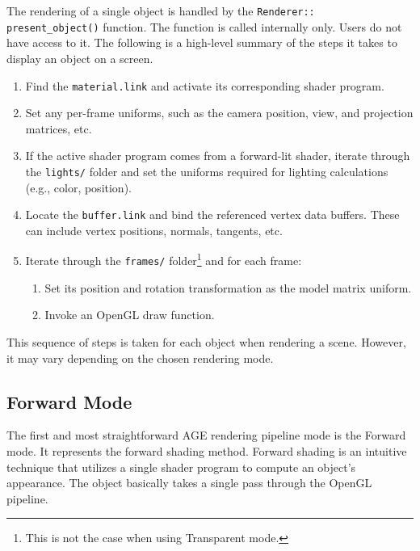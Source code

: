 \documentclass[
  digital,     %
  oneside,     %
  nosansbold,  %
  nocolorbold, %
  lof,         %
  lot,         %
]{fithesis4}
\begin{document}
The rendering of a single object is handled by the \verb|Renderer::|\\
\verb|present_object()| function.
The function is called internally only. Users do not have access to it.
The following is a high-level summary of the steps it takes to display an object on a screen.
\begin{enumerate}
    \item Find the \verb|material.link| and activate its corresponding shader program.
    
    \item Set any per-frame uniforms, such as the camera position,
    view, and projection matrices, etc.

    \item If the active shader program comes from a forward-lit shader, iterate through the \verb|lights/| folder
    and set the uniforms required for lighting calculations (e.g., color, position).

    \item Locate the \verb|buffer.link| and bind the referenced vertex data buffers. These
    can include vertex positions, normals, tangents, etc.

    \item Iterate through the \verb|frames/| folder\footnote{This is not the case when using Transparent mode.}
    and for each frame:

    \begin{enumerate}
        \item[5.1.] Set its position and rotation transformation as the model matrix uniform.
        
        \item[5.2.] Invoke an OpenGL draw function.
    \end{enumerate}
\end{enumerate}
This sequence of steps is taken for each object when rendering a scene. However, it may vary depending
on the chosen rendering mode.

\subsection{Forward Mode}\label{sec:forward-mode}
The first and most straightforward AGE rendering pipeline mode is the Forward mode. It represents the forward shading method.
Forward shading is an intuitive technique that utilizes a single
shader program to compute an object's appearance. The object basically takes a single pass through the OpenGL pipeline.
\end{document}
